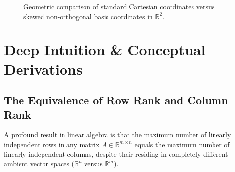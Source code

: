 \begin{figure}[htbp]
\caption{Geometric comparison of standard Cartesian coordinates versus skewed non-orthogonal basis coordinates in $\mathbb{R}^2$.}
\label{fig:basis_skew_coordinates}
\end{figure}

\section{Deep Intuition \& Conceptual Derivations}

\subsection{The Equivalence of Row Rank and Column Rank}

A profound result in linear algebra is that the maximum number of linearly independent rows in any matrix $A \in \mathbb{R}^{m \times n}$ equals the maximum number of linearly independent columns, despite their residing in completely different ambient vector spaces ($\mathbb{R}^n$ versus $\mathbb{R}^m$).

